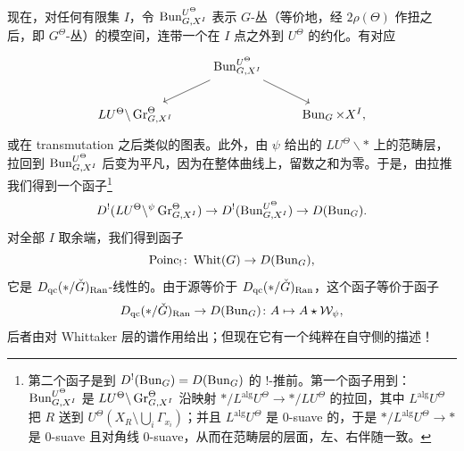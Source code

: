 现在，对任何有限集 $I$，令 $\operatorname{Bun}^{U^{\Theta}}_{G,X^{I}}$ 表示 $G$-丛（等价地，经 $2\rho(\Theta)$ 作扭之后，即 $G^{\Theta}$-丛）的模空间，连带一个在 $I$ 点之外到 $U^{\Theta}$ 的约化。有对应
\[
\begin{tikzcd}
 & \Bun^{U^{\Theta}}_{G,X^{I}} \arrow[dl] \arrow[dr] & \\
 LU^{\Theta}\backslash\Gr^{\Theta}_{G,X^{I}} & & \Bun_{G}\times X^{I},
\end{tikzcd}
\]
或在 transmutation 之后类似的图表。此外，由 $\psi$ 给出的 $LU^{\Theta}\backslash*$ 上的范畴层，拉回到 $\operatorname{Bun}^{U^{\Theta}}_{G,X^{I}}$ 后变为平凡，因为在整体曲线上，留数之和为零。于是，由拉推我们得到一个函子\footnote{第二个函子是到 $D^{!}(\operatorname{Bun}_G)=D(\operatorname{Bun}_G)$ 的 $!$-推前。第一个函子用到：$\operatorname{Bun}^{U^{\Theta}}_{G,X^{I}}$ 是 $LU^{\Theta}\backslash\operatorname{Gr}^{\Theta}_{G,X^{I}}$ 沿映射 $*/L^{\mathrm{alg}}U^{\Theta}\to*/LU^{\Theta}$ 的拉回，其中 $L^{\mathrm{alg}}U^{\Theta}$ 把 $R$ 送到 $U^{\Theta}(X_{R}\setminus\bigcup_{i}\Gamma_{x_{i}})$；并且 $L^{\mathrm{alg}}U^{\Theta}$ 是 $0$-suave 的，于是 $*/L^{\mathrm{alg}}U^{\Theta}\to*$ 是 $0$-suave 且对角线 $0$-suave，从而在范畴层的层面，左、右伴随一致。}
\[
D^{!}(LU^{\Theta}\backslash{}^{\psi}\operatorname{Gr}^{\Theta}_{G,X^{I}})\to D^{!}(\operatorname{Bun}^{U^{\Theta}}_{G,X^{I}})\to D(\operatorname{Bun}_{G}).
\]
对全部 $I$ 取余端，我们得到函子
\[
\mathrm{Poinc}_{!}\colon \operatorname{Whit}(G)\to D(\operatorname{Bun}_{G}),
\]
它是 $D_{\mathrm{qc}}(*/\check{G})_{\mathrm{Ran}}$-线性的。由于源等价于 $D_{\mathrm{qc}}(*/\check{G})_{\mathrm{Ran}}$，这个函子等价于函子
\[
D_{\mathrm{qc}}(*/\check{G})_{\mathrm{Ran}}\to D(\operatorname{Bun}_{G})\colon A\mapsto A\star\mathcal{W}_{\psi},
\]
后者由对 Whittaker 层的谱作用给出；但现在它有一个纯粹在自守侧的描述！
